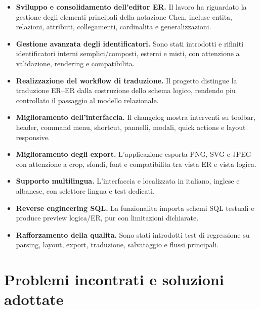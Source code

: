 \begin{itemize}
    \item \textbf{Sviluppo e consolidamento dell'editor ER.} Il lavoro ha riguardato la gestione degli elementi principali della notazione Chen, incluse entita, relazioni, attributi, collegamenti, cardinalita e generalizzazioni.
    \item \textbf{Gestione avanzata degli identificatori.} Sono stati introdotti e rifiniti identificatori interni semplici/composti, esterni e misti, con attenzione a validazione, rendering e compatibilita.
    \item \textbf{Realizzazione del workflow di traduzione.} Il progetto distingue la traduzione ER--ER dalla costruzione dello schema logico, rendendo piu controllato il passaggio al modello relazionale.
    \item \textbf{Miglioramento dell'interfaccia.} Il changelog mostra interventi su toolbar, header, command menu, shortcut, pannelli, modali, quick actions e layout responsive.
    \item \textbf{Miglioramento degli export.} L'applicazione esporta PNG, SVG e JPEG con attenzione a crop, sfondi, font e compatibilita tra vista ER e vista logica.
    \item \textbf{Supporto multilingua.} L'interfaccia e localizzata in italiano, inglese e albanese, con selettore lingua e test dedicati.
    \item \textbf{Reverse engineering SQL.} La funzionalita importa schemi SQL testuali e produce preview logica/ER, pur con limitazioni dichiarate.
    \item \textbf{Rafforzamento della qualita.} Sono stati introdotti test di regressione su parsing, layout, export, traduzione, salvataggio e flussi principali.
\end{itemize}

\section{Problemi incontrati e soluzioni adottate}

